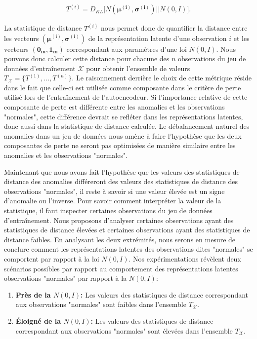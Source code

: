  \begin{gather}  \label{eq:metrique}
 T^{(i)} = D_{KL}\big[N(\boldsymbol{\mu^{(i)}}, \boldsymbol{\sigma^{(i)}}) || N(0, I)\big].
 \end{gather}
 
 La statistique de distance $T^{(i)}$ nous permet donc de quantifier la distance entre les vecteurs $(\boldsymbol{\mu^{(i)}}, \boldsymbol{\sigma^{(i)}})$ de la représentation latente d'une observation $i$ et les vecteurs $(\boldsymbol{0_m}, \boldsymbol{1_m})$ correspondant aux paramètres d'une loi $N(0,I)$. Nous pouvons donc calculer cette distance pour chacune des $n$ observations du jeu de données d'entraînement $\mathcal{X}$ pour obtenir l'ensemble de valeurs $T_{\mathcal{X}}=\{T^{(1)}, ..., T^{(n)}\}$. Le raisonnement derrière le choix de cette métrique réside dans le fait que celle-ci est utilisée comme composante dans le critère de perte utilisé lors de l'entraînement de l'autoencodeur. Si l'importance relative de cette composante de perte est différente entre les anomalies et les observations "normales", cette différence devrait se refléter dans les représentations latentes, donc aussi dans la statistique de distance calculée. Le débalancement naturel des anomalies dans un jeu de données nous amène à faire l'hypothèse que les deux composantes de perte ne seront pas optimisées de manière similaire entre les anomalies et les observations "normales".
 
 Maintenant que nous avons fait l'hypothèse que les valeurs des statistiques de distance des anomalies différeront des valeurs des statistiques de distance des observations "normales", il reste à savoir si une valeur élevée est un signe d'anomalie ou l'inverse. Pour savoir comment interpréter la valeur de la statistique, il faut inspecter certaines observations du jeu de données d'entraînement. Nous proposons d'analyser certaines observations ayant des statistiques de distance élevées et certaines observations ayant des statistiques de distance faibles. En analysant les deux extrémités, nous serons en mesure de conclure comment les représentations latentes des observations dites "normales" se comportent par rapport à la loi $N(0,I)$. Nos expérimentations révèlent deux scénarios possibles par rapport au comportement des représentations latentes observations "normales" par rapport à la $N(0,I)$:

\begin{enumerate} \label{liste_scenarios}
	\item \textbf{Près de la $N(0,I)$:} Les valeurs des statistiques de distance correspondant aux observations "normales" sont faibles dans l'ensemble $T_{\mathcal{X}}$.
	\item \textbf{Éloigné de la $N(0,I)$:} Les valeurs des statistiques de distance correspondant aux observations "normales" sont élevées dans l'ensemble $T_{\mathcal{X}}$.
\end{enumerate}

